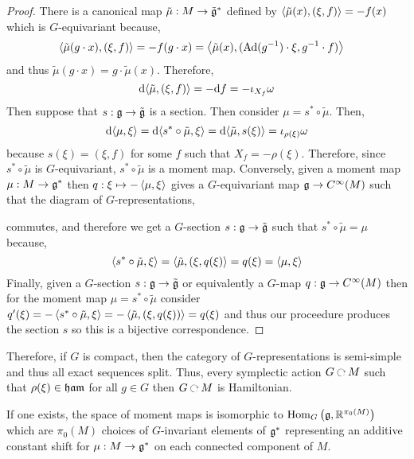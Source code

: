 \documentclass[12pt]{extarticle}
\newcommand{\R}{\mathbb{R}}
\newcommand{\Ad}{\mathrm{Ad}}
\begin{document}
\begin{proof}
There is a canonical map $\tilde{\mu} : M \to \tilde{\mathfrak{g}}^*$ defined by $\left< \tilde{\mu}(x) , (\xi, f) \right> = -f(x)$ which is $G$-equivariant because,
\begin{align*}
\inner{\tilde{\mu}(g \cdot x)}{(\xi, f)} & = -f(g \cdot x) = \inner{\tilde{\mu}(x)}{(\Ad(g^{-1}) \cdot \xi, g^{-1} \cdot f)} 
\end{align*}
and thus $\tilde{\mu}(g \cdot x) = g \cdot \tilde{\mu}(x)$. Therefore,
\[ \mathrm{d}{\left< \tilde{\mu} , (\xi, f) \right>} = -\mathrm{d}{f} = -\iota_{X_f} \omega \]
Then suppose that $s : \mathfrak{g} \to \tilde{\mathfrak{g}}$ is a section. Then consider $\mu = s^* \circ \tilde{\mu}$. Then,
\[ \mathrm{d}{\left< \mu , \xi \right>} = \mathrm{d}{\left< s^* \circ \tilde{\mu} , \xi \right>} = \mathrm{d}{\left< \tilde{\mu} , s(\xi) \right>} = \iota_{\rho(\xi)} \omega \]
because $s(\xi) = (\xi, f)$ for some $f$ such that $X_f = - \rho(\xi)$. Therefore, since $s^* \circ \tilde{\mu}$ is $G$-equivariant, $s^* \circ \tilde{\mu}$ is a moment map. Conversely, given a moment map $\mu : M \to \mathfrak{g}^*$ then $q : \xi \mapsto -\left< \mu , \xi \right>$ gives a $G$-equivariant map $\mathfrak{g} \to C^{\infty}(M)$ such that the diagram of $G$-representations,
\begin{center}
\end{center}
commutes, and therefore we get a $G$-section $s : \mathfrak{g} \to \tilde{\mathfrak{g}}$ such that $s^* \circ \tilde{\mu} = \mu$ because,
\[ \left< s^* \circ \tilde{\mu} , \xi \right> = \left< \tilde{\mu} , (\xi, q(\xi) \right> = q(\xi) = \left< \mu , \xi \right> \]
Finally, given a $G$-section $s : \mathfrak{g} \to \tilde{\mathfrak{g}}$ or equivalently a $G$-map $q : \mathfrak{g} \to C^{\infty}(M)$ then for the moment map $\mu = s^* \circ \tilde{\mu}$ consider $q'(\xi) = - \left< s^* \circ \tilde{\mu} , \xi \right> = - \left< \tilde{\mu} , (\xi, q(\xi)) \right> = q(\xi)$ and thus our proceedure produces the section $s$ so this is a bijective correspondence.
\end{proof}

\begin{rmk}
Therefore, if $G$ is compact, then the category of $G$-representations is semi-simple and thus all exact sequences split. Thus, every symplectic action $G \acts M$ such that $\rho(\xi) \in \mathfrak{ham}$ for all $g \in G$ then $G \acts M$ is Hamiltonian.
\end{rmk}

\begin{cor}
If one exists, the space of moment maps is isomorphic to $\Hom{G}{\g}{\R^{\pi_0(M)}}$ which are $\pi_0(M)$ choices of $G$-invariant elements of $\mathfrak{g}^*$ representing an additive constant shift for $\mu : M \to \mathfrak{g}^*$ on each connected component of $M$.
\end{cor}
\end{document}
